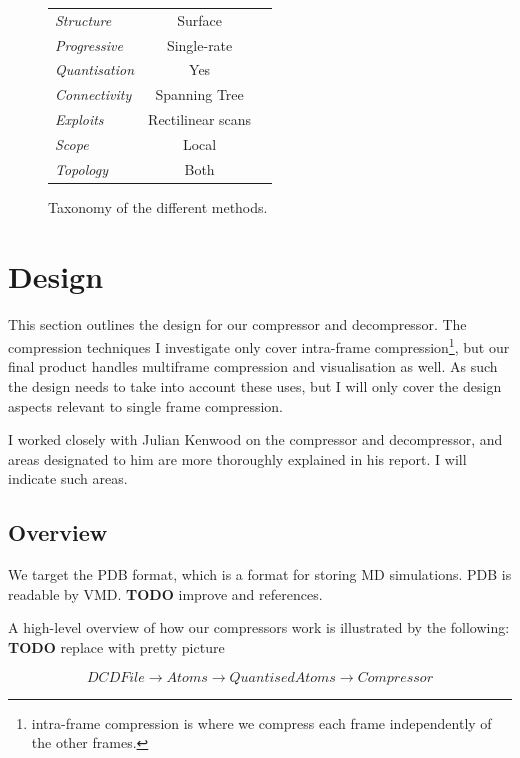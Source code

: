 \documentclass{report}
\begin{document}
\begin{figure}
{\begin{tabular}{||l|c|c||}
  \hline

  \emph{Structure} & Surface & \\

  \emph{Progressive} & Single-rate & \\

  \emph{Quantisation} & Yes & \\

  \emph{Connectivity} & Spanning Tree & \\

  \emph{Exploits} & Rectilinear scans & \\

  \emph{Scope} & Local & \\

  \emph{Topology} & Both & \\

  \hline
\end{tabular}
}
\caption{Taxonomy of the different methods.}\label{fig:taxonomy}
\end{figure}


\chapter{Design}

This section outlines the design for our compressor and decompressor. The
compression techniques I investigate only cover intra-frame
compression\footnote{intra-frame compression is where we compress each frame
  independently of the other frames.}, but our final product handles
multiframe compression and visualisation as well. As such the design needs to
take into account these uses, but I will only cover the design aspects
relevant to single frame compression.

I worked closely with Julian Kenwood on the compressor and decompressor, and
areas designated to him are more thoroughly explained in his report. I will
indicate such areas.

\section{Overview}

We target the PDB format, which is a format for storing MD simulations. PDB is
readable by VMD. \textbf{TODO} improve and references.

A high-level overview of how our compressors work is illustrated by the
following: \textbf{TODO} replace with pretty picture

\[ DCDFile \to Atoms \to QuantisedAtoms \to Compressor \]
\end{document}
